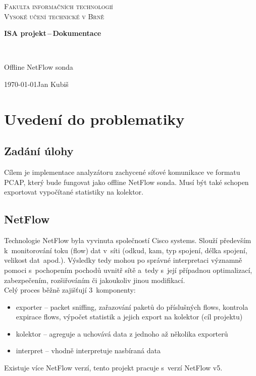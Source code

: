 \documentclass[12pt,a4paper,titlepage]{extarticle}
\begin{document}
\begin{titlepage}
\begin{center}

\begin{Huge}\textsc{Fakulta informačních technologií\\Vysoké učení technické v Brně}\end{Huge}

\begin{LARGE} \textbf{ISA projekt\,--\,Dokumentace}\end{LARGE}
\\ \vspace{2mm}
\begin{LARGE}Offline NetFlow sonda\end{LARGE}

\end{center}

\begin{large}\today  \hfill  Jan Kubiš\end{large}
\end{titlepage}

\tableofcontents
\newpage

\section{Uvedení do problematiky}

\subsection{Zadání úlohy}
Cílem je implementace analyzátoru zachycené síťové komunikace ve formatu PCAP, který bude fungovat jako offline NetFlow sonda. Musí být také schopen exportovat vypočítané statistiky na kolektor.

\subsection{NetFlow}
Technologie NetFlow byla vyvinuta společností Cisco systems. Slouží především k~monitorování toku (flow) dat v~síti (odkud, kam, typ spojení, délka spojení, velikost dat~apod.). Výsledky tedy mohou po správné interpretaci významně pomoci s~pochopením pochodů uvnitř sítě a~tedy s~její případnou optimalizací, zabezpečením, rozšiřováním či jakoukoliv jinou modifikací.
\\Celý proces běžně zajišťují 3~komponenty:
\begin{itemize}[noitemsep,nolistsep]
\item exporter -- packet sniffing, zařazování paketů do příslušných flows, kontrola expirace flows, výpočet statistik a jejich export na kolektor (cíl projektu)
\item kolektor -- agreguje a uchovává data z jednoho až několika exporterů
\item interpret -- vhodně interpretuje nasbíraná data
\end{itemize}
Existuje více NetFlow verzí, tento projekt pracuje s~verzí NetFlow v5.
\end{document}

